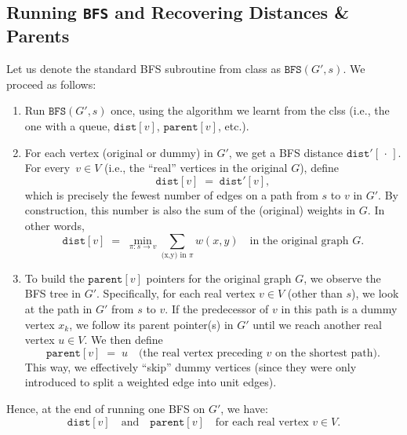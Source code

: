 \documentclass[11pt]{article}
\begin{document}
    \subsection*{Running \texttt{BFS} and Recovering Distances \& Parents}
    Let us denote the standard BFS subroutine from class as \(\texttt{BFS}(G', s)\). We proceed as follows:
    \begin{enumerate}
        \item Run \(\texttt{BFS}(G', s)\) once, using the algorithm we learnt from the clss (i.e., the one with a queue, \(\texttt{dist}[v]\), \(\texttt{parent}[v]\), etc.). 
        \item For each vertex (original or dummy) in \(G'\), we get a BFS distance \(\texttt{dist}'[\,\cdot\,]\). For every \(\,v\in V\) (i.e., the ``real'' vertices in the original \(G\)), define 
        \[
          \texttt{dist}[v] \;=\; \texttt{dist}'[v],
        \]
        which is precisely the fewest number of edges on a path from \(s\) to \(v\) in \(G'\). By construction, this number is also the sum of the (original) weights in \(G\). In other words,
        \[
          \texttt{dist}[v]
          \;=\;
          \min_{\pi: s \to v} \sum_{\text{(x,y) in }\pi} w(x,y)
          \quad
          \text{in the original graph $G$}.
        \]
    
        \item To build the \(\texttt{parent}[v]\) pointers for the original graph \(G\), we observe the BFS tree in \(G'\). Specifically, for each real vertex \(v\in V\) (other than \(s\)), we look at the path in \(G'\) from \(s\) to \(v\). If the predecessor of \(v\) in this path is a dummy vertex \(x_{k}\), we follow its parent pointer(s) in \(G'\) until we reach another real vertex \(u\in V\). We then define
        \[
          \texttt{parent}[v] \;=\; u
          \quad
          \text{(the real vertex preceding $v$ on the shortest path)}.
        \]
        This way, we effectively ``skip'' dummy vertices (since they were only introduced to split a weighted edge into unit edges). 
    \end{enumerate}
    
    \noindent
    Hence, at the end of running one BFS on \(G'\), we have:
    \[
      \texttt{dist}[v] 
      \quad\text{and}\quad
      \texttt{parent}[v]
      \quad
      \text{for each real vertex $v\in V$.}
    \]
    
\end{document}
